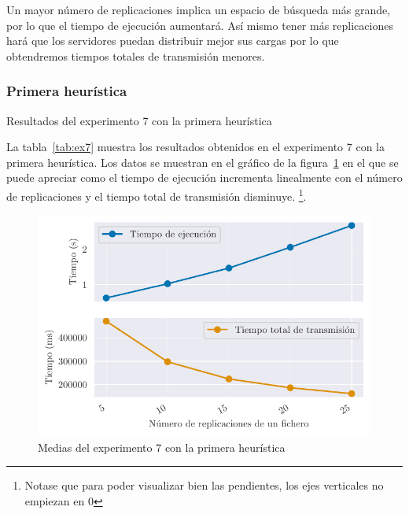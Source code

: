 \begin{hyp*}
    Un mayor número de replicaciones implica un espacio de búsqueda más grande, por lo que el tiempo de ejecución
    aumentará. Así mismo tener más replicaciones hará que los servidores puedan distribuir mejor sus cargas por
    lo que obtendremos tiempos totales de transmisión menores.
\end{hyp*}

\subsubsection{Primera heurística}
\begin{table}[H]
    \centering
    \caption{Resultados del experimento 7 con la primera heurística}%
    \label{tab:ex7}
    \begin{center}
    
    \end{center}
\end{table}

La tabla~\ref{tab:ex7} muestra los resultados obtenidos en el experimento 7 con la primera heurística. Los
datos se muestran en el gráfico de la figura~\ref{fig:ex7means} en el que se puede apreciar como el tiempo
de ejecución incrementa linealmente con el número de replicaciones y el tiempo total de transmisión disminuye.
\footnote{Notase que para poder visualizar bien las pendientes, los ejes verticales no empiezan en 0}.

\begin{figure}[H]
    \centering
    \includegraphics{include/plots/ex7_means.pdf}
    \caption{Medias del experimento 7 con la primera heurística}%
    \label{fig:ex7means}
\end{figure}

